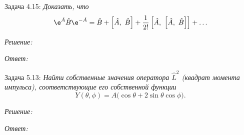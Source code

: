 \newpage

Задача 4.15: \emph{Доказать, что}
\vspace*{-1em}
\[
    \e^{\hat{A}}\hat{B}\e^{-\hat{A}} = \hat{B} + \comm{\hat{A}}{\hat{B}} +
    \frac{1}{2!}\comm{\hat{A}}{\comm{\hat{A}}{\hat{B}}} + \ldots
\]

\vspace*{2em}
\emph{Решение:}

\vspace*{2em}
\emph{Ответ:}

\newpage

Задача 5.13: \emph{Найти собственные значения оператора \( \hat{L}^2 \) (квадрат момента 
импульса), соответствующие его собственной функции}
\vspace*{-1em}
\[
    Y(\theta, \phi) = A\big(\cos\theta + 2\sin\theta\cos\phi\big).
\]

\vspace*{2em}
\emph{Решение:}

\vspace*{2em}
\emph{Ответ:}


